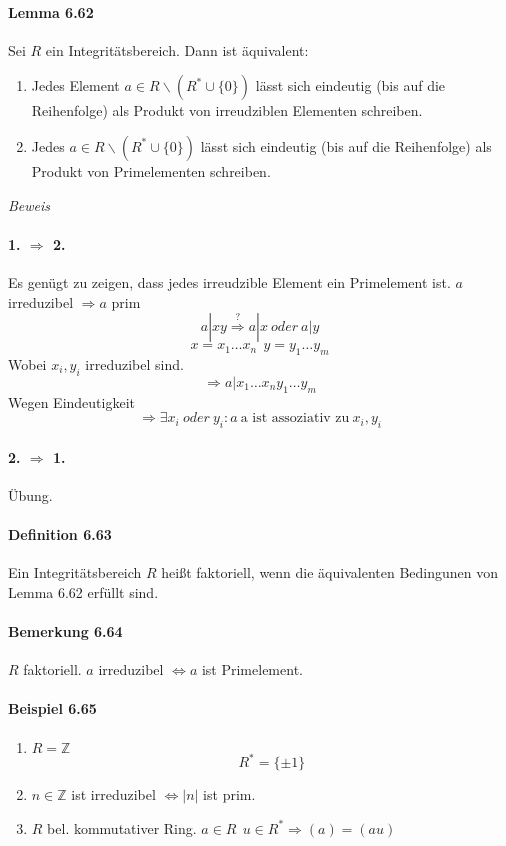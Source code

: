 \documentclass{scrartcl}
\begin{document}
\paragraph{Lemma 6.62}
Sei $R$ ein Integritätsbereich. Dann ist äquivalent:
\begin{enumerate}
\item Jedes Element $a \in R\backslash (R^*\cup \{0\})$ lässt sich eindeutig
  (bis auf die Reihenfolge) als Produkt von irreudziblen Elementen schreiben.
\item Jedes $a \in R\backslash (R^*\cup \{0\})$ lässt sich eindeutig
  (bis auf die Reihenfolge) als Produkt von Primelementen schreiben. 
\end{enumerate}
\textit{Beweis}
\paragraph{1. $\Rightarrow$ 2.} 
Es genügt zu zeigen, dass jedes irreudzible Element ein Primelement ist.
$a$ irreduzibel $\Rightarrow a$ prim
\[
  a|xy \overset{?}{\Rightarrow} a|x ~oder~ a|y
\]
\[
  x = x_1 \dots x_n ~~ y = y_1 \dots y_m
\]
Wobei $x_i,y_i$ irreduzibel sind.
\[
  \Rightarrow a|x_1 \dots x_n y_1 \dots y_m
\]
Wegen Eindeutigkeit
\[
  \Rightarrow \exists x_i ~oder~ y_i: a ~\text{a ist assoziativ zu}~x_i,y_i
\]
\paragraph{2. $\Rightarrow$ 1.}
Übung.

\paragraph{Definition 6.63}
Ein Integritätsbereich $R$ heißt faktoriell, wenn die äquivalenten Bedingunen
von Lemma 6.62 erfüllt sind.

\paragraph{Bemerkung 6.64}
$R$ faktoriell. $a$ irreduzibel $\Leftrightarrow a$ ist Primelement. 

\paragraph{Beispiel 6.65}
\begin{enumerate}
\item $R = \mathbb{Z}$
  \[
    R^* = \{ \pm 1\}
  \]
\item $ n \in \mathbb{Z}$ ist irreduzibel $\Leftrightarrow |n|$ ist prim.
\item $R$ bel. kommutativer Ring. $a \in R ~~ u \in R^* \Rightarrow (a) = (au)$
\end{enumerate}
\end{document}
